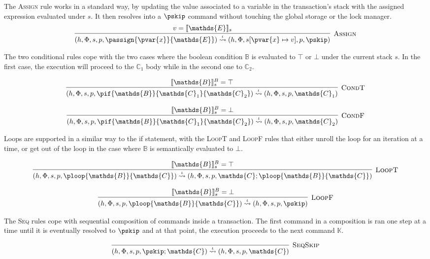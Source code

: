 The \textsc{Assign} rule works in a standard way, by updating the value associated to a variable in the transaction's stack with the assigned expression evaluated under $s$. It then resolves into a $\pskip$ command without touching the global storage or the lock manager.
\[
\infer[\textsc{Assign}]
{
	(h, \Phi, s, p, \passign{\pvar{x}}{\mathds{E}})
	\overset{\iota}{\rightsquigarrow}
	(h, \Phi, s[\pvar{x} \mapsto v], p, \pskip)
}
{
	v = \llbracket \mathds{E} \rrbracket_s
}
\]

The two conditional rules cope with the two cases where the boolean condition $\mathds{B}$ is evaluated to $\top$ or $\bot$ under the current stack $s$. In the first case, the execution will proceed to the $\mathds{C}_1$ body while in the second one to $\mathds{C}_2$.

\[
\infer[\textsc{CondT}]
{
	(h, \Phi, s, p, \pif{\mathds{B}}{\mathds{C}_1}{\mathds{C}_2})
	\overset{\iota}{\rightsquigarrow}
	(h, \Phi, s, p, \mathds{C}_1)
}
{
	\llbracket \mathds{B} \rrbracket_s^B = \top
}
\]

\[
\infer[\textsc{CondF}]
{
	(h, \Phi, s, p, \pif{\mathds{B}}{\mathds{C}_1}{\mathds{C}_2})
	\overset{\iota}{\rightsquigarrow}
	(h, \Phi, s, p, \mathds{C}_2)
}
{
	\llbracket \mathds{B} \rrbracket_s^B = \bot
}
\]

Loops are supported in a similar way to the if statement, with the \textsc{LoopT} and \textsc{LoopF} rules that either unroll the loop for an iteration at a time, or get out of the loop in the case where $\mathds{B}$ is semantically evaluated to $\bot$.

\[
\infer[\textsc{LoopT}]
{
	(h, \Phi, s, p, \ploop{\mathds{B}}{\mathds{C}})
	\overset{\iota}{\rightsquigarrow}
	(h, \Phi, s, p, \mathds{C}; \ploop{\mathds{B}}{\mathds{C}})
}
{
	\llbracket \mathds{B} \rrbracket_s^B = \top
}
\]

\[
\infer[\textsc{LoopF}]
{
	(h, \Phi, s, p, \ploop{\mathds{B}}{\mathds{C}})
	\overset{\iota}{\rightsquigarrow}
	(h, \Phi, s, p, \pskip)
}
{
	\llbracket \mathds{B} \rrbracket_s^B = \bot
}
\]

The \textsc{Seq} rules cope with sequential composition of commands inside a transaction. The first command in a composition is ran one step at a time until it is eventually resolved to $\pskip$ and at that point, the execution proceeds to the next command $\mathds{K}$.

\[
\infer[\textsc{SeqSkip}]
{
	(h, \Phi, s, p, \pskip ; \mathds{C})
	\overset{\iota}{\rightsquigarrow}
	(h, \Phi, s, p, \mathds{C})
}
{}
\]

